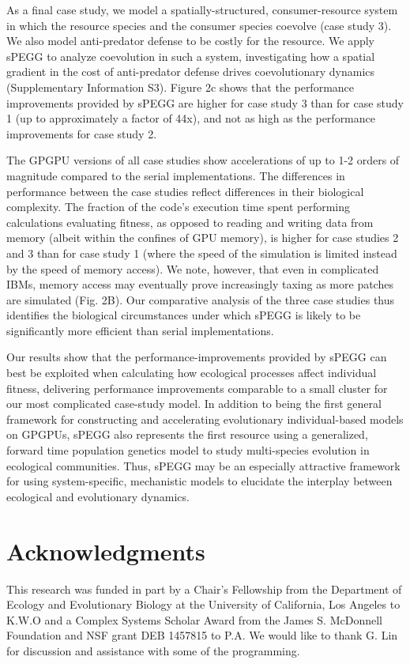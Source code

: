 \documentclass[1p,numbered]{article}
\begin{document}
\begin{linenumbers}
As a final case study, we model a spatially-structured, consumer-resource system in which the resource species and the consumer species coevolve (case study 3). We also model anti-predator defense to be costly for the resource. We apply sPEGG to analyze coevolution in such a system, investigating how a spatial gradient in the cost of anti-predator defense drives coevolutionary dynamics (Supplementary Information S3). Figure 2c shows that the performance improvements provided by sPEGG are higher for case study 3 than for case study 1 (up to approximately a factor of 44x), and not as high as the performance improvements for case study 2. 

The GPGPU versions of all case studies show accelerations of up to 1-2 orders of magnitude compared to the serial implementations. The differences in performance between the case studies reflect differences in their biological complexity. The fraction of the code's execution time spent performing calculations evaluating fitness, as opposed to reading and writing data from memory (albeit within the confines of GPU memory), is higher for case studies 2 and 3 than for case study 1 (where the speed of the simulation is limited instead by the speed of memory access). We note, however, that even in complicated IBMs, memory access may eventually prove increasingly taxing as more patches are simulated (Fig. 2B). Our comparative analysis of the three case studies thus identifies the biological circumstances under which sPEGG is likely to be significantly more efficient than serial implementations.   

Our results show that the performance-improvements provided by sPEGG can best be exploited when calculating how ecological processes affect individual fitness, delivering performance improvements comparable to a small cluster for our most complicated case-study model. In addition to being the first general framework for constructing and accelerating evolutionary individual-based models on GPGPUs, sPEGG also represents the first resource using a generalized, forward time population genetics model to study multi-species evolution in ecological communities. Thus, sPEGG may be an especially attractive framework for using system-specific, mechanistic models to elucidate the interplay between ecological and evolutionary dynamics. 

\end{linenumbers}
\section*{Acknowledgments}
This research was funded in part by a Chair's Fellowship from the Department of Ecology and Evolutionary Biology at the University of California, Los Angeles to K.W.O and a Complex Systems Scholar Award from the James S. McDonnell Foundation and  NSF grant  DEB 1457815 to P.A. We would like to thank G. Lin for discussion and assistance with some of the programming. 
\end{document}
